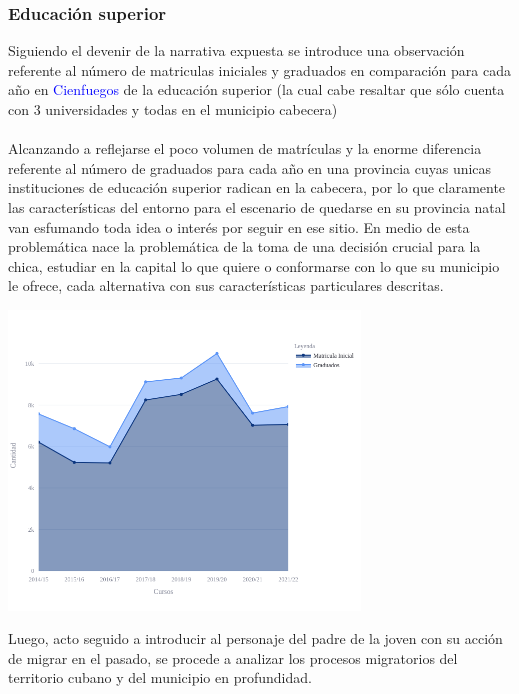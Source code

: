 \documentclass{article}
\begin{document}
\subsubsection{Educación superior}
Siguiendo el devenir de la narrativa expuesta se introduce una observación referente al número de matriculas iniciales y graduados en comparación para cada año en \textcolor{blue}{Cienfuegos} de la educación superior (la cual cabe resaltar que sólo cuenta con 3 universidades y todas en el municipio cabecera)\\\\
Alcanzando a reflejarse el poco volumen de matrículas y la enorme diferencia referente al número de graduados para cada año en una provincia cuyas unicas instituciones de educación superior radican en la cabecera, por lo que claramente las características del entorno para el escenario de quedarse en su provincia natal van esfumando toda idea o interés por seguir en ese sitio.
En medio de esta problemática nace la problemática de la toma de una decisión crucial para la chica, estudiar en la capital lo que quiere o conformarse con lo que su municipio le ofrece, cada alternativa con sus características particulares descritas.
\begin{center}
\includegraphics[width=0.7\textwidth]{img/fig2.png}
\end{center}
Luego, acto seguido a introducir al personaje del padre de la joven con su acción de migrar en el pasado, se procede a analizar los procesos migratorios del territorio cubano y del municipio en profundidad.
\end{document}
